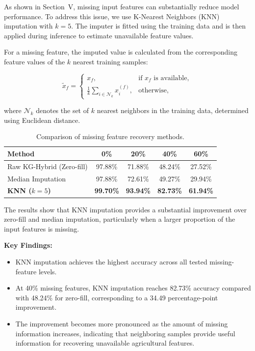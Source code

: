 \documentclass[journal]{IEEEtran}
\begin{document}
As shown in Section~V, missing input features can substantially reduce model performance. To address this issue, we use K-Nearest Neighbors (KNN) imputation with $k=5$. The imputer is fitted using the training data and is then applied during inference to estimate unavailable feature values.

For a missing feature, the imputed value is calculated from the corresponding feature values of the $k$ nearest training samples:

\begin{equation}
\tilde{x}_f =
\begin{cases}
x_f, & \text{if } x_f \text{ is available}, \\[4pt]
\displaystyle\frac{1}{k}
\sum_{i \in \mathcal{N}_k} x_i^{(f)},
& \text{otherwise},
\end{cases}
\end{equation}

where $\mathcal{N}_k$ denotes the set of $k$ nearest neighbors in the training data, determined using Euclidean distance.

\begin{table}[t]
\centering
\caption{Comparison of missing feature recovery methods.}
\label{tab:imputation}
\begin{tabular}{lcccc}
\hline
\textbf{Method} & \textbf{0\%} & \textbf{20\%} & \textbf{40\%} & \textbf{60\%} \\
\hline
Raw KG-Hybrid (Zero-fill) & 97.88\% & 71.88\% & 48.24\% & 27.52\% \\
Median Imputation & 97.88\% & 72.61\% & 49.27\% & 29.94\% \\
\hline
\textbf{KNN ($k=5$)} & \textbf{99.70\%} & \textbf{93.94\%} & 
\textbf{82.73\%} & \textbf{61.94\%} \\
\hline
\end{tabular}
\end{table}

The results show that KNN imputation provides a substantial improvement over zero-fill and median imputation, particularly when a larger proportion of the input features is missing.

\textbf{Key Findings:}

\begin{itemize}[leftmargin=1.2em]
    \item KNN imputation achieves the highest accuracy across all tested missing-feature levels.

    \item At 40\% missing features, KNN imputation reaches 82.73\% accuracy compared with 48.24\% for zero-fill, corresponding to a 34.49 percentage-point improvement.

    \item The improvement becomes more pronounced as the amount of missing information increases, indicating that neighboring samples provide useful information for recovering unavailable agricultural features.
\end{itemize}
\end{document}
